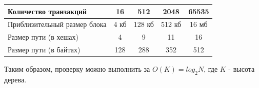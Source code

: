 \documentclass[utf8,14pt,a4paper,oneside,russian]{book}
\begin{document}
	\begin{longtable}{l|c|c|c|c}
		Количество транзакций&16&512&2048&65535\\\hline
		Приблизительный размер блока&4 кб&128 кб& 512 кб&16 мб\\\hline
		Размер пути (в хешах)&4&9&11&16\\\hline
		Размер пути (в байтах)&128&288&352&512\\
	\end{longtable}

	Таким образом, проверку можно выполнить за $O(K)=log_2N$, где $K$ - высота дерева.
	
	
\end{document}
